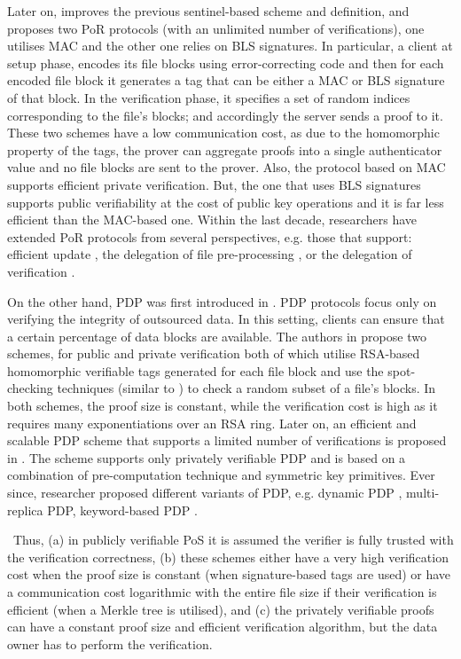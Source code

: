 Later on, \cite{DBLP:conf/asiacrypt/ShachamW08} improves the previous sentinel-based scheme and definition, and proposes two PoR protocols (with an unlimited number of verifications), one utilises  MAC and the other one relies on BLS signatures. In particular, a client at setup phase, encodes its file blocks using error-correcting code and then for each encoded file block it generates a  tag that can be either a MAC or BLS signature of that block. In the verification phase, it specifies a set of random indices corresponding to the file's blocks; and accordingly the server sends a proof to it. These two  schemes have a low communication cost, as due   to the homomorphic property of the tags,  the prover can aggregate  proofs  into a single authenticator value and no file blocks  are sent to the prover. Also, the protocol based on MAC supports efficient private verification. But, the one that uses BLS signatures supports public verifiability at the cost of public key operations and it is far less efficient than the MAC-based one. Within the  last decade, researchers have extended PoR protocols from several perspectives, e.g. those that support:  efficient update \cite{DBLP:conf/ccs/ShiSP13}, the delegation of file pre-processing \cite{ArmknechtBBK16}, or the delegation of verification \cite{armknecht2014outsourced}.  


On the other hand, PDP was first introduced in \cite{DBLP:conf/ccs/AtenieseBCHKPS07}. PDP protocols focus only on verifying the  integrity of outsourced data. In this setting,  clients can ensure that a certain percentage of data blocks are available. The authors in \cite{DBLP:conf/ccs/AtenieseBCHKPS07} propose two schemes, for public and private verification both of which utilise RSA-based homomorphic verifiable tags  generated for each file block and use the spot-checking techniques (similar to \cite{DBLP:conf/asiacrypt/ShachamW08}) to check a random subset of a file's blocks. In both schemes, the proof size is constant, while the verification cost is high as it requires  many  exponentiations over an RSA ring. Later on, an  efficient and scalable  PDP scheme that supports a limited number of verifications is proposed in \cite{AteniesePMT08}. The scheme supports only privately verifiable PDP and is based on a combination of pre-computation technique and symmetric key primitives.  Ever since, researcher proposed different variants of PDP, e.g.  dynamic PDP \cite{ErwayKPT09}, multi-replica PDP\cite{DistributedPDP}, keyword-based PDP \cite{SenguptaR18}.  

\
Thus,  (a) in publicly verifiable PoS it is assumed the verifier is fully trusted with the verification correctness, (b) these schemes either have a very high verification cost when the proof size is constant (when signature-based tags are used) or have a communication cost logarithmic with the entire file size if their verification is efficient (when a Merkle tree is utilised),  and (c) the privately verifiable proofs can have a constant proof size and efficient verification algorithm, but the data owner has to perform the verification. 



